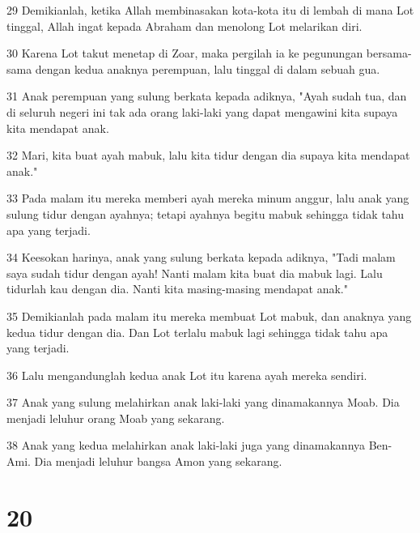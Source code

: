 \par 29 Demikianlah, ketika Allah membinasakan kota-kota itu di lembah di mana Lot tinggal, Allah ingat kepada Abraham dan menolong Lot melarikan diri.
\par 30 Karena Lot takut menetap di Zoar, maka pergilah ia ke pegunungan bersama-sama dengan kedua anaknya perempuan, lalu tinggal di dalam sebuah gua.
\par 31 Anak perempuan yang sulung berkata kepada adiknya, "Ayah sudah tua, dan di seluruh negeri ini tak ada orang laki-laki yang dapat mengawini kita supaya kita mendapat anak.
\par 32 Mari, kita buat ayah mabuk, lalu kita tidur dengan dia supaya kita mendapat anak."
\par 33 Pada malam itu mereka memberi ayah mereka minum anggur, lalu anak yang sulung tidur dengan ayahnya; tetapi ayahnya begitu mabuk sehingga tidak tahu apa yang terjadi.
\par 34 Keesokan harinya, anak yang sulung berkata kepada adiknya, "Tadi malam saya sudah tidur dengan ayah! Nanti malam kita buat dia mabuk lagi. Lalu tidurlah kau dengan dia. Nanti kita masing-masing mendapat anak."
\par 35 Demikianlah pada malam itu mereka membuat Lot mabuk, dan anaknya yang kedua tidur dengan dia. Dan Lot terlalu mabuk lagi sehingga tidak tahu apa yang terjadi.
\par 36 Lalu mengandunglah kedua anak Lot itu karena ayah mereka sendiri.
\par 37 Anak yang sulung melahirkan anak laki-laki yang dinamakannya Moab. Dia menjadi leluhur orang Moab yang sekarang.
\par 38 Anak yang kedua melahirkan anak laki-laki juga yang dinamakannya Ben-Ami. Dia menjadi leluhur bangsa Amon yang sekarang.

\chapter{20}

